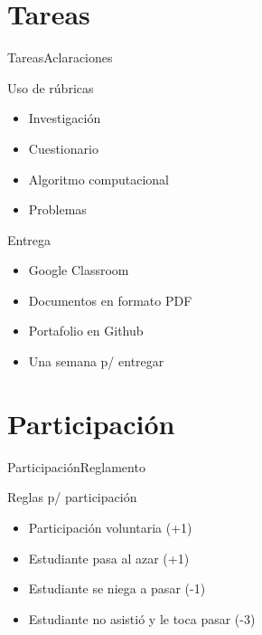 \documentclass[10pt]{beamer}
\begin{document}
\section{Tareas}
\begin{frame}{Tareas}{Aclaraciones}
\begin{block}{Uso de rúbricas}
    \begin{itemize}
        \item Investigación
        \item Cuestionario
        \item Algoritmo computacional
        \item Problemas
    \end{itemize}
\end{block}

\begin{block}{Entrega}
    \begin{itemize}
        \item Google Classroom
        \item Documentos en formato PDF
        \item Portafolio en Github
        \item Una semana p/ entregar
    \end{itemize}
\end{block}

\end{frame}

\section{Participación}
\begin{frame}{Participación}{Reglamento}
\begin{block}{Reglas p/ participación}
    \begin{itemize}
        \item Participación voluntaria (+1)
        \item Estudiante pasa al azar (+1)
        \item Estudiante se niega a pasar (-1)
        \item Estudiante no asistió y le toca pasar (-3)
    \end{itemize}
\end{block}

\end{frame}
\end{document}
